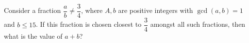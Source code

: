 Consider a fraction $\dfrac{a}{b} \neq \dfrac{3}{4}$, where $A,b$ are positive integers with $\gcd(a,b) = 1$ and $b \leq 15$. If this fraction is chosen closest to $\dfrac{3}{4}$ amongst all such fractions, then what is the value of $a+b$?
